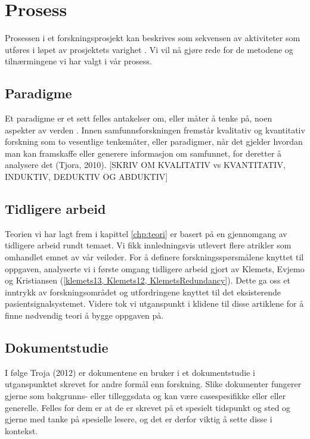 \section{Prosess}
\label{chp: prosess}

Prosessen i et forskningsprosjekt kan beskrives som sekvensen av aktiviteter som utføres i løpet av prosjektets varighet \cite{Oates}. Vi vil nå gjøre rede for de metodene og tilnærmingene vi har valgt i vår prosess.

\subsection{Paradigme}
Et paradigme er et sett felles antakelser om, eller måter å tenke på, noen aspekter av verden \cite{Oates}. Innen samfunnsforskningen fremstår kvalitativ og kvantitativ forskning som to vesentlige tenkemåter, eller paradigmer, når det gjelder hvordan man kan framskaffe eller generere informasjon om samfunnet, for deretter å analysere det (Tjora, 2010).
[SKRIV OM KVALITATIV vs KVANTITATIV, INDUKTIV, DEDUKTIV OG ABDUKTIV]

\subsection{Tidligere arbeid}
Teorien vi har lagt frem i kapittel \ref{chp:teori} er basert på en gjennomgang av tidligere arbeid rundt temaet. Vi fikk innledningsvis utlevert flere atrikler som omhandlet emnet av vår veileder. For å definere forskningsspørsmålene knyttet til oppgaven, analyserte vi i første omgang tidligere arbeid gjort av Klemets, Evjemo og Kristiansen (\ref{klemets13, Klemets12, KlemetsRedundancy}). Dette ga oss et inntrykk av forskningsområdet og utfordringene knyttet til det eksisterende pasientsignalsystemet. Videre tok vi utganspunkt i klidene til disse artiklene for å finne nødvendig teori å bygge oppgaven på. 

\subsection{Dokumentstudie}
I følge Troja (2012) er dokumentene en bruker i et dokumentstudie i utganspunktet skrevet for andre formål enn forskning. Slike dokumenter fungerer gjerne som bakgrunns- eller tilleggsdata og kan være casespesifikke eller eller generelle. Felles for dem er at de er skrevet på et spesielt tidspunkt og sted og gjerne med tanke på spesielle lesere, og det er derfor viktig å sette disse i kontekst. 

